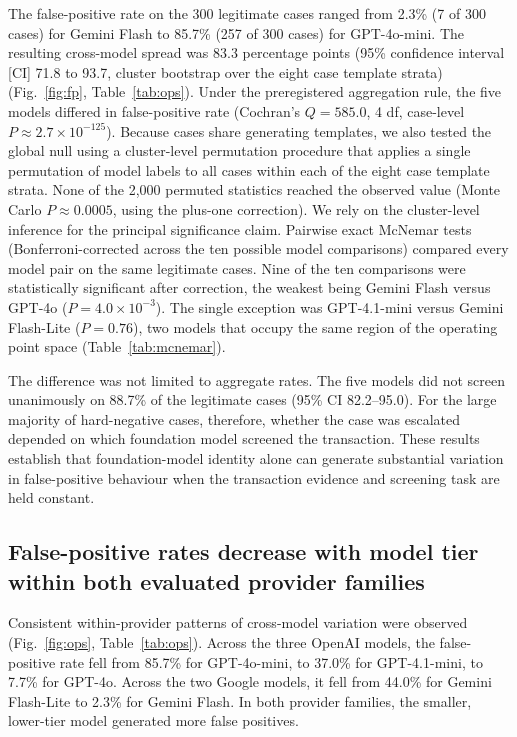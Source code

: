 \documentclass[pdflatex,sn-basic,Numbered]{sn-jnl}
\begin{document}
The false-positive rate on the 300 legitimate cases ranged from 2.3\% (7 of 300 cases) for Gemini Flash to 85.7\% (257 of 300 cases) for GPT-4o-mini. The resulting cross-model spread was 83.3 percentage points (95\% confidence interval [CI] 71.8 to 93.7, cluster bootstrap over the eight case template strata) (Fig.~\ref{fig:fp}, Table~\ref{tab:ops}). Under the preregistered aggregation rule, the five models differed in false-positive rate (Cochran's $Q = 585.0$, 4 df, case-level $P \approx 2.7\times10^{-125}$). Because cases share generating templates, we also tested the global null using a cluster-level permutation procedure that applies a single permutation of model labels to all cases within each of the eight case template strata. None of the 2,000 permuted statistics reached the observed value (Monte Carlo $P \approx 0.0005$, using the plus-one correction). We rely on the cluster-level inference for the principal significance claim. Pairwise exact McNemar tests (Bonferroni-corrected across the ten possible model comparisons) compared every model pair on the same legitimate cases. Nine of the ten comparisons were statistically significant after correction, the weakest being Gemini Flash versus GPT-4o ($P = 4.0\times10^{-3}$). The single exception was GPT-4.1-mini versus Gemini Flash-Lite ($P = 0.76$), two models that occupy the same region of the operating point space (Table~\ref{tab:mcnemar}).

The difference was not limited to aggregate rates. The five models did not screen unanimously on 88.7\% of the legitimate cases (95\% CI 82.2--95.0). For the large majority of hard-negative cases, therefore, whether the case was escalated depended on which foundation model screened the transaction. These results establish that foundation-model identity alone can generate substantial variation in false-positive behaviour when the transaction evidence and screening task are held constant.

\subsection{False-positive rates decrease with model tier within both evaluated provider families}\label{sec:tier}

Consistent within-provider patterns of cross-model variation were observed (Fig.~\ref{fig:ops}, Table~\ref{tab:ops}). Across the three OpenAI models, the false-positive rate fell from 85.7\% for GPT-4o-mini, to 37.0\% for GPT-4.1-mini, to 7.7\% for GPT-4o. Across the two Google models, it fell from 44.0\% for Gemini Flash-Lite to 2.3\% for Gemini Flash. In both provider families, the smaller, lower-tier model generated more false positives.
\end{document}
